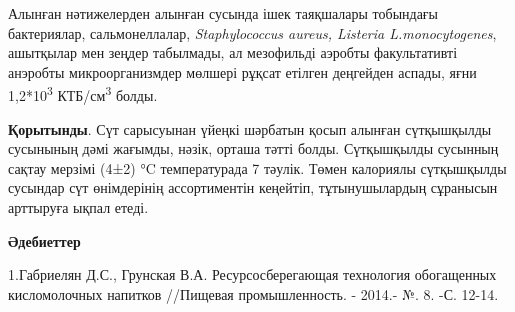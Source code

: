 {{%
% 

Алынған нәтижелерден алынған сусында ішек таяқшалары тобындағы
бактериялар, сальмонеллалар, \emph{Staphylococcus aureus, Listeria
L.monocytogenes}, ашытқылар мен зеңдер табылмады, ал мезофильді аэробты
факультативті анэробты микроорганизмдер мөлшері рұқсат етілген деңгейден
аспады, яғни 1,2*10\textsuperscript{3} КТБ/см\textsuperscript{3} болды.

{\bfseries Қорытынды}. Сүт сарысуынан үйеңкі шәрбатын қосып алынған
сүтқышқылды сусынының дәмі жағымды, нәзік, орташа тәтті болды.
Сүтқышқылды сусынның сақтау мерзімі (4±2) °C температурада 7 тәулік.
Төмен калориялы сүтқышқылды сусындар сүт өнімдерінің ассортиментін
кеңейтіп, тұтынушылардың сұранысын арттыруға ықпал етеді.

{\bfseries Әдебиеттер}

1.Габриелян Д.С., Грунская В.А. Ресурсосберегающая технология
обогащенных кисломолочных напитков //Пищевая промышленность. - 2014.- №.
8. -С. 12-14.

}}
